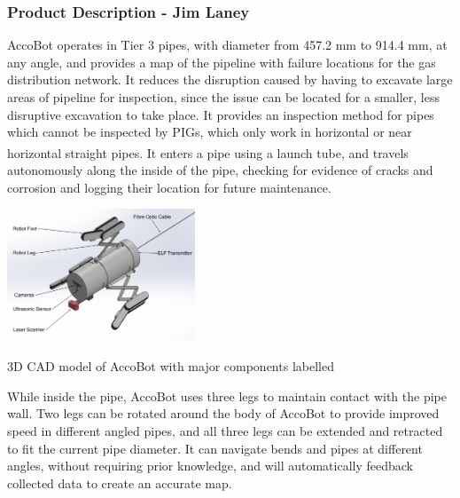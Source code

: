 \documentclass[11pt]{article}		%
\newcommand{\supercite}[1]{\textsuperscript{\cite{#1}}}		%
\begin{document}
	\subsubsection[Product Description]{Product Description - Jim Laney}
	        
			AccoBot operates in Tier 3 pipes, with diameter from 457.2 mm to 914.4 mm, at any angle, and provides a map of the pipeline with failure locations for the gas distribution network.
			It reduces the disruption caused by having to excavate large areas of pipeline for inspection, since the issue can be located for a smaller, less disruptive excavation to take place.
			It provides an inspection method for pipes which cannot be inspected by PIGs, which only work in horizontal or near horizontal straight pipes\supercite{mills2017advances}.
			It enters a pipe using a launch tube, and travels autonomously along the inside of the pipe, checking for evidence of cracks and corrosion and logging their location for future maintenance.
			\begin{floatingfigure}[r]{0.45\textwidth}
			    \centering
				\includegraphics[width = 0.42\textwidth]{overviewCADLabels}
				\caption{3D CAD model of AccoBot with major components labelled}
				\label{3DSketch}
			\end{floatingfigure}
			\hspace*{3ex} While inside the pipe, AccoBot uses three legs to maintain contact with the pipe wall.
			Two legs can be rotated around the body of AccoBot to provide improved speed in different angled pipes, and all three legs can be extended and retracted to fit the current pipe diameter.
			It can navigate bends and pipes at different angles, without requiring prior knowledge, and will automatically feedback collected data to create an accurate map.
			\begin{floatingfigure}[r]{0pt} \end{floatingfigure}
\end{document}
